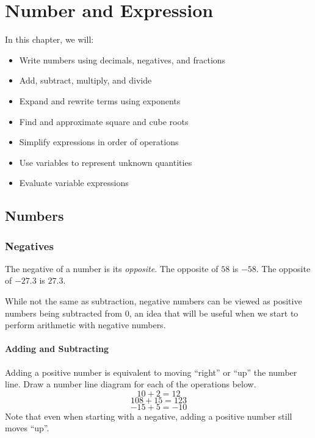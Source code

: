 

\chapter{Number and Expression}

\begin{summary}
In this chapter, we will:
\begin{itemize}
    \item Write numbers using decimals, negatives, and fractions
    \item Add, subtract, multiply, and divide
    \item Expand and rewrite terms using exponents
    \item Find and approximate square and cube roots
    \item Simplify expressions in order of operations 
    \item Use variables to represent unknown quantities
    \item Evaluate variable expressions
    
\end{itemize}
\end{summary}



\newpage 
\section{Numbers}


\subsection{Negatives}
The negative of a number is its \emph{opposite}.  The opposite of \(58\) is \(-58\).  The opposite of \(-27.3\) is \(27.3\).  

While not the same as subtraction, negative numbers can be viewed as positive numbers being subtracted from \(0\), an idea that will be useful when we start to perform arithmetic with negative numbers.  

\subsubsection{Adding and Subtracting} 
Adding a positive number is equivalent to moving ``right'' or ``up'' the number line.  
Draw a number line diagram for each of the operations below. 
\[10 + 2 = 12  \]
\[ 108 + 15 = 123  \]
\[  -15 + 5 = -10   \]
Note that even when starting with a negative, adding a positive number still moves ``up''. 

